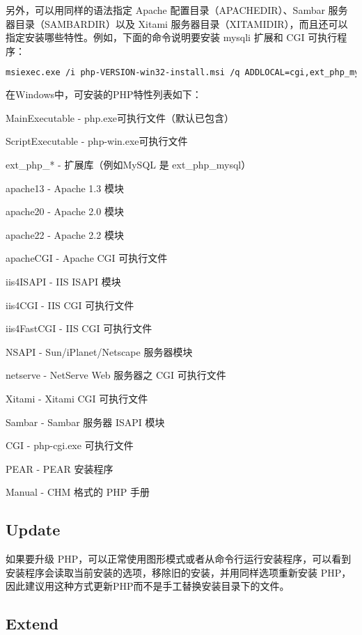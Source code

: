 另外，可以用同样的语法指定 Apache 配置目录（APACHEDIR）、Sambar 服务器目录（SAMBARDIR）以及 Xitami 服务器目录（XITAMIDIR），而且还可以指定安装哪些特性。例如，下面的命令说明要安装 mysqli 扩展和 CGI 可执行程序：

\begin{lstlisting}[language=bash]
msiexec.exe /i php-VERSION-win32-install.msi /q ADDLOCAL=cgi,ext_php_mysqli
\end{lstlisting}


在Windows中，可安装的PHP特性列表如下：

\begin{compactitem}
\item MainExecutable - php.exe可执行文件（默认已包含）
\item ScriptExecutable - php-win.exe可执行文件
\item ext\_php\_* - 扩展库（例如MySQL 是 ext\_php\_mysql）
\item apache13 - Apache 1.3 模块
\item apache20 - Apache 2.0 模块
\item apache22 - Apache 2.2 模块
\item apacheCGI - Apache CGI 可执行文件
\item iis4ISAPI - IIS ISAPI 模块
\item iis4CGI - IIS CGI 可执行文件
\item iis4FastCGI - IIS CGI 可执行文件
\item NSAPI - Sun/iPlanet/Netscape 服务器模块
\item netserve - NetServe Web 服务器之 CGI 可执行文件
\item Xitami - Xitami CGI 可执行文件
\item Sambar - Sambar 服务器 ISAPI 模块
\item CGI - php-cgi.exe 可执行文件
\item PEAR - PEAR 安装程序
\item Manual - CHM 格式的 PHP 手册
\end{compactitem}

\subsection{Update}


如果要升级 PHP，可以正常使用图形模式或者从命令行运行安装程序，可以看到安装程序会读取当前安装的选项，移除旧的安装，并用同样选项重新安装 PHP，因此建议用这种方式更新PHP而不是手工替换安装目录下的文件。


\subsection{Extend}


